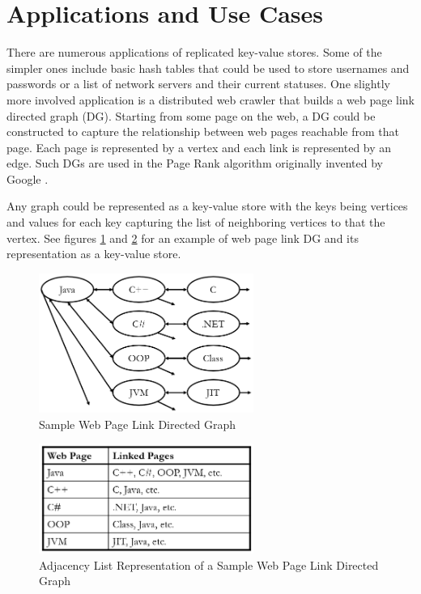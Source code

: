 \documentclass[sigconf,nonacm,10pt]{acmart}
\begin{document}
\section{Applications and Use Cases}
There are numerous applications of replicated key-value stores. Some of the simpler ones include basic hash tables that could be used to store usernames and passwords or a list of network servers and their current statuses. One slightly more involved application is a distributed web crawler that builds a web page link directed graph (DG). Starting from some page on the web, a DG could be constructed to capture the relationship between web pages reachable from that page. Each page is represented by a vertex and each link is represented by an edge. Such DGs are used in the Page Rank algorithm originally invented by Google \cite{brin1998anatomy}.

Any graph could be represented as a key-value store with the keys being vertices and values for each key capturing the list of neighboring vertices to that the vertex. See figures \ref{fig:wiki1} and \ref{fig:wiki2} for an example of web page link DG and its representation as a key-value store.

\begin{figure}[h]
  \centering
  \includegraphics[width=7cm]{Fig11Wiki1}
  \caption{Sample Web Page Link Directed Graph}
  \label{fig:wiki1}
\end{figure}

\begin{figure}[h]
  \centering
  \includegraphics[width=7cm]{Fig12Wiki2}
  \caption{Adjacency List Representation of a Sample Web Page Link Directed Graph}
  \label{fig:wiki2}
\end{figure}
\end{document}
